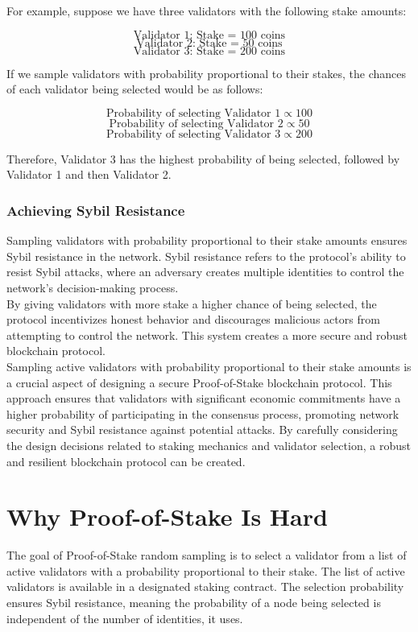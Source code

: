 For example, suppose we have three validators with the following stake amounts:

$$
\text{Validator 1: } \text{Stake = 100 coins}
$$
$$
\text{Validator 2: } \text{Stake = 50 coins}
$$
$$
\text{Validator 3: } \text{Stake = 200 coins}
$$

If we sample validators with probability proportional to their stakes, the chances of each validator being selected would be as follows:

$$
\text{Probability of selecting Validator 1} \propto 100
$$
$$
\text{Probability of selecting Validator 2} \propto 50
$$
$$
\text{Probability of selecting Validator 3} \propto 200
$$

Therefore, Validator 3 has the highest probability of being selected, followed by Validator 1 and then Validator 2.

\subsubsection{Achieving Sybil Resistance}
Sampling validators with probability proportional to their stake amounts ensures Sybil resistance in the network. Sybil resistance refers to the protocol's ability to resist Sybil attacks, where an adversary creates multiple identities to control the network's decision-making process.\\
By giving validators with more stake a higher chance of being selected, the protocol incentivizes honest behavior and discourages malicious actors from attempting to control the network. This system creates a more secure and robust blockchain protocol.\\
Sampling active validators with probability proportional to their stake amounts is a crucial aspect of designing a secure Proof-of-Stake blockchain protocol. This approach ensures that validators with significant economic commitments have a higher probability of participating in the consensus process, promoting network security and Sybil resistance against potential attacks. By carefully considering the design decisions related to staking mechanics and validator selection, a robust and resilient blockchain protocol can be created.

\section{Why Proof-of-Stake Is Hard}
The goal of Proof-of-Stake random sampling is to select a validator from a list of active validators with a probability proportional to their stake. The list of active validators is available in a designated staking contract. The selection probability ensures Sybil resistance, meaning the probability of a node being selected is independent of the number of identities, it uses.
